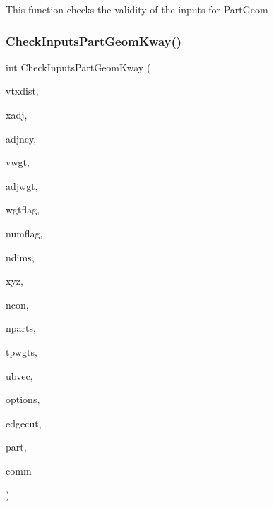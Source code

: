 This function checks the validity of the inputs for Part\+Geom \mbox{\label{a00951_a40bc148a58cc3f245c36b4795f92ea4b}} 
\subsubsection{\texorpdfstring{Check\+Inputs\+Part\+Geom\+Kway()}{CheckInputsPartGeomKway()}}
{\footnotesize\ttfamily int Check\+Inputs\+Part\+Geom\+Kway (\begin{DoxyParamCaption}\item[{\hyperlink{a00876_aaa5262be3e700770163401acb0150f52}{idx\+\_\+t} $\ast$}]{vtxdist,  }\item[{\hyperlink{a00876_aaa5262be3e700770163401acb0150f52}{idx\+\_\+t} $\ast$}]{xadj,  }\item[{\hyperlink{a00876_aaa5262be3e700770163401acb0150f52}{idx\+\_\+t} $\ast$}]{adjncy,  }\item[{\hyperlink{a00876_aaa5262be3e700770163401acb0150f52}{idx\+\_\+t} $\ast$}]{vwgt,  }\item[{\hyperlink{a00876_aaa5262be3e700770163401acb0150f52}{idx\+\_\+t} $\ast$}]{adjwgt,  }\item[{\hyperlink{a00876_aaa5262be3e700770163401acb0150f52}{idx\+\_\+t} $\ast$}]{wgtflag,  }\item[{\hyperlink{a00876_aaa5262be3e700770163401acb0150f52}{idx\+\_\+t} $\ast$}]{numflag,  }\item[{\hyperlink{a00876_aaa5262be3e700770163401acb0150f52}{idx\+\_\+t} $\ast$}]{ndims,  }\item[{\hyperlink{a00876_a1924a4f6907cc3833213aba1f07fcbe9}{real\+\_\+t} $\ast$}]{xyz,  }\item[{\hyperlink{a00876_aaa5262be3e700770163401acb0150f52}{idx\+\_\+t} $\ast$}]{ncon,  }\item[{\hyperlink{a00876_aaa5262be3e700770163401acb0150f52}{idx\+\_\+t} $\ast$}]{nparts,  }\item[{\hyperlink{a00876_a1924a4f6907cc3833213aba1f07fcbe9}{real\+\_\+t} $\ast$}]{tpwgts,  }\item[{\hyperlink{a00876_a1924a4f6907cc3833213aba1f07fcbe9}{real\+\_\+t} $\ast$}]{ubvec,  }\item[{\hyperlink{a00876_aaa5262be3e700770163401acb0150f52}{idx\+\_\+t} $\ast$}]{options,  }\item[{\hyperlink{a00876_aaa5262be3e700770163401acb0150f52}{idx\+\_\+t} $\ast$}]{edgecut,  }\item[{\hyperlink{a00876_aaa5262be3e700770163401acb0150f52}{idx\+\_\+t} $\ast$}]{part,  }\item[{M\+P\+I\+\_\+\+Comm $\ast$}]{comm }\end{DoxyParamCaption})}

